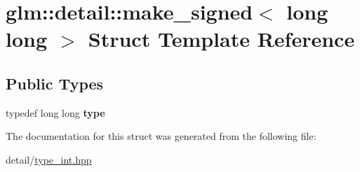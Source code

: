 \hypertarget{structglm_1_1detail_1_1make__signed_3_01long_01long_01_4}{\section{glm\-:\-:detail\-:\-:make\-\_\-signed$<$ long long $>$ Struct Template Reference}
\label{structglm_1_1detail_1_1make__signed_3_01long_01long_01_4}
}
\subsection*{Public Types}
\begin{DoxyCompactItemize}
\item 
\hypertarget{structglm_1_1detail_1_1make__signed_3_01long_01long_01_4_a109303fc9f5838a2843711c023a57bc8}{typedef long long {\bfseries type}}\label{structglm_1_1detail_1_1make__signed_3_01long_01long_01_4_a109303fc9f5838a2843711c023a57bc8}

\end{DoxyCompactItemize}


The documentation for this struct was generated from the following file\-:\begin{DoxyCompactItemize}
\item 
detail/\hyperlink{type__int_8hpp}{type\-\_\-int.\-hpp}\end{DoxyCompactItemize}
